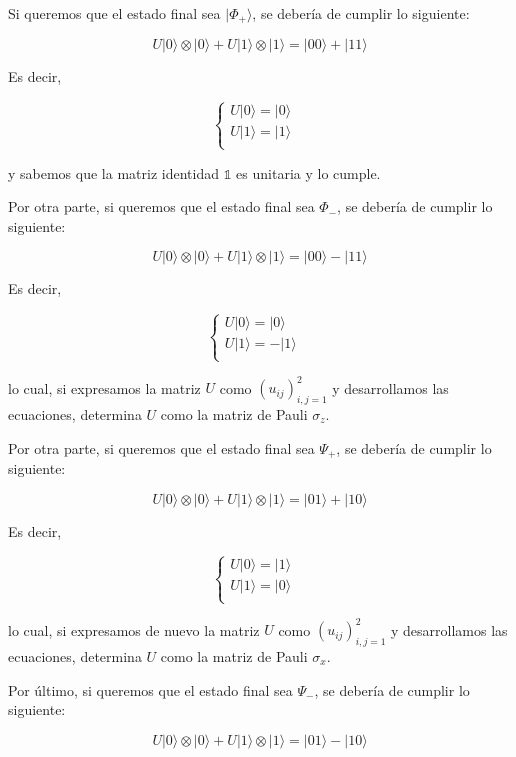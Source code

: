 \documentclass{article}
\begin{document}
Si queremos que el estado final sea $|\Phi_+\rangle$,
se debería de cumplir lo siguiente:

$$
  U|0\rangle \otimes |0\rangle +
    U|1\rangle \otimes |1\rangle = |00\rangle + |11\rangle
$$

Es decir,

$$
  \begin{cases}
    U|0\rangle = |0\rangle &\\
    U|1\rangle = |1\rangle &\\
  \end{cases}
$$

y sabemos que la matriz identidad $\mathbb{1}$ es unitaria y 
lo cumple.

Por otra parte, si queremos que el estado final sea $\Phi_-$,
se debería de cumplir lo siguiente: 

$$
  U|0\rangle \otimes |0\rangle +
    U|1\rangle \otimes |1\rangle = |00\rangle - |11\rangle
$$

Es decir,

$$
  \begin{cases}
    U|0\rangle = |0\rangle &\\
    U|1\rangle = -|1\rangle &\\
  \end{cases}
$$

lo cual, si expresamos la matriz $U$ como $(u_{ij})_{i,j=1}^2$
y desarrollamos las ecuaciones, determina $U$ como la matriz de 
Pauli $\sigma_z$.

Por otra parte, si queremos que el estado final sea $\Psi_+$,
se debería de cumplir lo siguiente: 

$$
  U|0\rangle \otimes |0\rangle +
    U|1\rangle \otimes |1\rangle = |01\rangle + |10\rangle
$$

Es decir,

$$
  \begin{cases}
    U|0\rangle = |1\rangle &\\
    U|1\rangle = |0\rangle &\\
  \end{cases}
$$

lo cual, si expresamos de nuevo la matriz $U$ como 
$(u_{ij})_{i,j=1}^2$ y desarrollamos las ecuaciones, determina $U$ 
como la matriz de Pauli $\sigma_x$.

Por último, si queremos que el estado final sea $\Psi_-$,
se debería de cumplir lo siguiente: 

$$
  U|0\rangle \otimes |0\rangle +
    U|1\rangle \otimes |1\rangle = |01\rangle - |10\rangle
$$
\end{document}
